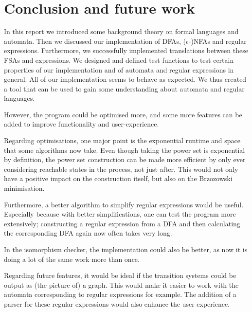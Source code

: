 
\section{Conclusion and future work}\label{sec:Conclusion}
In this report we introduced some background theory on formal languages and automata. Then we discussed our implementation of DFAs, ($\epsilon$-)NFAs and regular expressions. Furthermore, we successfully implemented translations between these FSAs and expressions. We designed and defined test functions to test certain properties of our implementation and of automata and regular expressions in general. All of our implementation seems to behave as expected. We thus created a tool that can be used to gain some understanding about automata and regular languages.

However, the program could be optimised more, and some more features can be added to improve functionality and user-experience.

Regarding optimisations, one major point is the exponential runtime and space that some algorithms now take. Even though taking the power set is exponential by definition, the power set construction can be made more efficient by only ever considering reachable states in the process, not just after. This would not only have a positive impact on the construction itself, but also on the Brzozowski minimisation. 

Furthermore, a better algorithm to simplify regular expressions would be useful. Especially because with better simplifications, one can test the program more extensively; constructing a regular expression from a DFA and then calculating the corresponding DFA again now often takes very long.

In the isomorphism checker, the implementation could also be better, as now it is doing a lot of the same work more than once.


Regarding future features, it would be ideal if the transition systems could be output as (the picture of) a graph. This would make it easier to work with the automata corresponding to regular expressions for example. The addition of a parser for these regular expressions would also enhance the user experience. 


